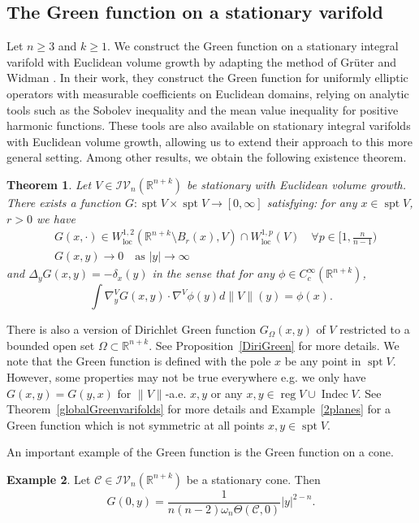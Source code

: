 \documentclass[11pt]{amsart}
\newtheorem{theorem}{Theorem}[section]
\theoremstyle{definition}
\newtheorem{example}[theorem]{Example}
\newcommand{\R}{\mathbb{R}}
\newcommand{\C}{\mathcal{C}}
\newcommand{\IV}{\mathcal{IV}}
\newcommand{\loc}{\mathrm{loc}}
\DeclareMathOperator{\spt}{spt}
\DeclareMathOperator{\reg}{reg}
\DeclareMathOperator{\indec}{Indec}
\begin{document}
\subsection{The Green function on a stationary varifold}Let $n \ge 3$ and $k \ge 1$. We construct the Green function on a stationary integral varifold with Euclidean volume growth by adapting the method of Gr\"uter and Widman \cite{gruter1982green}. In their work, they construct the Green function for uniformly elliptic operators with measurable coefficients on Euclidean domains, relying on analytic tools such as the Sobolev inequality and the mean value inequality for positive harmonic functions. These tools are also available on stationary integral varifolds with Euclidean volume growth, allowing us to extend their approach to this more general setting. Among other results, we obtain the following existence theorem.
\begin{theorem}
	Let $V\in \IV_n(\R^{n+k})$ be stationary with Euclidean volume growth. There exists a function $G:\spt V\times \spt V\to [0,\infty]$
		satisfying: for any $x\in \spt V$, $r>0$ we have 
		\begin{align*}
			&G(x,\cdot)\in W_\loc^{1,2}( \R^{n+k}\setminus B_{r}(x),V)\cap W_\loc^{1,p}(V)\quad \forall p\in [1,\frac{n}{n-1})\\
			&G(x,y)\to0\quad\text{as }|y|\to\infty
		\end{align*}
		and  $\Delta_y G(x,y)=-\delta_x(y)$ in the sense that for any $\phi\in C_c^\infty(\R^{n+k})$, 
		\[
			\int\nabla _y^V G(x,y) \cdot \nabla^V\phi(y)d\|V\|(y)=\phi(x).
		\]
\end{theorem}There is also a version of Dirichlet Green function $G_\Omega(x,y)$ of $V$ restricted to a bounded open set $\Omega\subset \R^{n+k}$. See Proposition~\ref{DiriGreen} for more details.
We note that the Green function is defined with the pole $x$ be any point in $\spt V$. However, some properties may not be true everywhere e.g. we only have $G(x,y)=G(y,x)$ for $\|V\|$-a.e. $x,y$ or any $x,y\in \reg V\cup \indec V$. See Theorem~\ref{globalGreenvarifolds} for more details and Example~\ref{2planes} for a Green function which is not symmetric at all points $x,y\in \spt V$. 

An important example of the Green function is the Green function on a cone.
\begin{example}
	Let $\C\in \IV_n(\R^{n+k})$ be a stationary cone. Then
	\[G(0,y)=\frac{1}{n(n-2)\omega_n\Theta(\C,0)}|y|^{2-n}.\]
\end{example}
\end{document}
